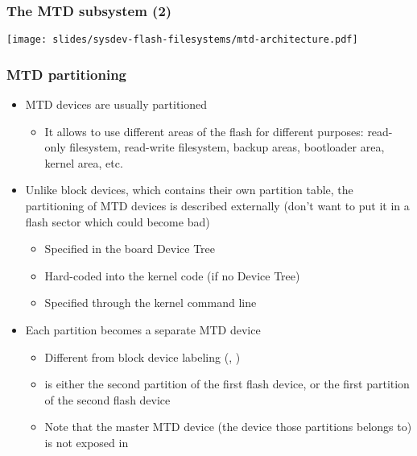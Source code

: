 \begin{frame}
  \frametitle{The MTD subsystem (2)}
  \begin{center}
    \texttt{[image: slides/sysdev-flash-filesystems/mtd-architecture.pdf]}
  \end{center}
\end{frame}

\begin{frame}
  \frametitle{MTD partitioning}
  \begin{itemize}
  \item MTD devices are usually partitioned
    \begin{itemize}
    \item It allows to use different areas of the flash for different
      purposes: read-only filesystem, read-write filesystem, backup
      areas, bootloader area, kernel area, etc.
    \end{itemize}
  \item Unlike block devices, which contains their own partition
    table, the partitioning of MTD devices is described externally
    (don't want to put it in a flash sector which could become bad)
    \begin{itemize}
    \item Specified in the board Device Tree
    \item Hard-coded into the kernel code (if no Device Tree)
    \item Specified through the kernel command line
    \end{itemize}
  \item Each partition becomes a separate MTD device
    \begin{itemize}
    \item Different from block device labeling (,
      )
    \item {} is either the second partition of the first
      flash device, or the first partition of the second flash device
    \item Note that the master MTD device (the device those partitions
      belongs to) is not exposed in 
    \end{itemize}
  \end{itemize}
\end{frame}


